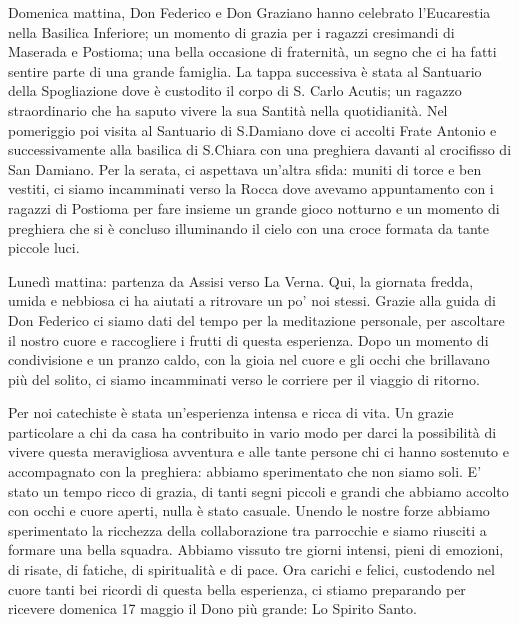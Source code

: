Domenica mattina, Don Federico  e Don  Graziano hanno celebrato l'Eucarestia nella Basilica Inferiore; un momento di grazia per i ragazzi cresimandi di  Maserada e  Postioma; una bella occasione di fraternità, un segno che ci ha fatti sentire parte di una grande famiglia. La tappa successiva è stata al Santuario della Spogliazione dove è custodito il corpo di S. Carlo Acutis; un ragazzo straordinario che ha saputo vivere la sua Santità nella quotidianità. Nel pomeriggio poi visita al Santuario di S.Damiano dove ci accolti Frate Antonio e successivamente alla basilica di S.Chiara con una preghiera davanti al crocifisso di San Damiano. Per la serata, ci aspettava un'altra sfida:  muniti di torce e ben vestiti, ci siamo incamminati verso la Rocca dove avevamo appuntamento con i ragazzi di Postioma per fare insieme un grande gioco notturno e un momento di preghiera che si è concluso illuminando il cielo con una croce formata da tante piccole luci. 


Lunedì mattina: partenza da Assisi verso La Verna. Qui, la giornata fredda, umida e nebbiosa ci ha aiutati a ritrovare un po' noi stessi.  Grazie alla guida di Don Federico  ci siamo dati del tempo per la  meditazione personale, per ascoltare il nostro cuore e raccogliere i frutti di questa esperienza. Dopo un momento di condivisione e un pranzo caldo, con la gioia nel cuore e gli occhi che brillavano più del solito,  ci siamo incamminati verso le corriere per il viaggio di ritorno.

Per noi catechiste è stata un'esperienza intensa e ricca di vita. Un grazie particolare a chi da casa ha contribuito in vario modo per darci la possibilità di vivere questa meravigliosa avventura e alle tante persone chi ci hanno sostenuto e accompagnato con la preghiera: abbiamo sperimentato che non siamo soli.  E' stato un tempo ricco di grazia, di tanti segni piccoli e grandi che abbiamo accolto con occhi e cuore aperti, nulla è stato casuale. Unendo le nostre forze abbiamo sperimentato la ricchezza della collaborazione tra parrocchie e siamo riusciti a formare una bella  squadra.  Abbiamo vissuto tre giorni intensi, pieni  di emozioni, di risate, di fatiche, di spiritualità e di pace.  Ora carichi e felici, custodendo nel cuore tanti bei ricordi di questa bella esperienza, ci stiamo preparando per ricevere domenica 17 maggio il Dono più grande: Lo Spirito Santo. 

